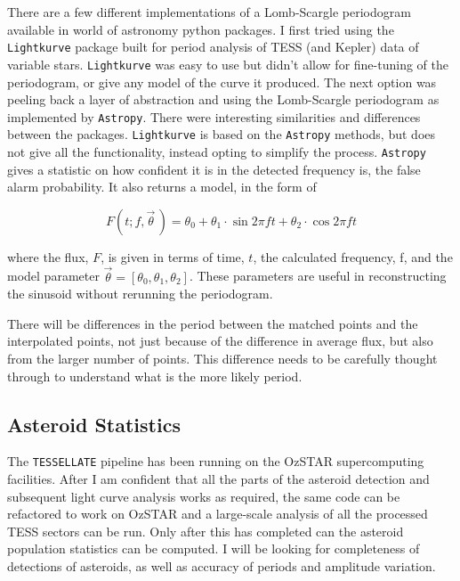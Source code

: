 \documentclass[12pt]{article}
\begin{document}
There are a few different implementations of a Lomb-Scargle periodogram available in world of astronomy python packages.
I first tried using the \texttt{Lightkurve} \citep{Lightkurve2018} package built for period analysis of TESS (and Kepler) data of variable stars.
\texttt{Lightkurve} was easy to use but didn't allow for fine-tuning of the periodogram, or give any model of the curve it produced.
The next option was peeling back a layer of abstraction and using the Lomb-Scargle periodogram as implemented by \texttt{Astropy}\citep[\citet{Astropy2022} but see][for the implementation]{Vanderplas2012,Vanderplas2015}. 
There were interesting similarities and differences between the packages.
\texttt{Lightkurve} is based on the \texttt{Astropy} methods, but does not give all the functionality, instead opting to simplify the process.
\texttt{Astropy} gives a statistic on how confident it is in the detected frequency is, the false alarm probability.
It also returns a model, in the form of

\begin{equation}
  \label{Eq:LCModel}
  F(t;f,\vec{\theta}\,) = \theta_0 + \theta_1\cdot\sin{2\pi ft} +\theta_2\cdot\cos{2\pi ft}
\end{equation}

where the flux, $F$, is given in terms of time, $t$, the calculated frequency, f, and the model parameter $\vec{\theta} = [\theta_0, \theta_1,\theta_2]$.
These parameters are useful in reconstructing the sinusoid without rerunning the periodogram.


There will be differences in the period between the matched points and the interpolated points, not just because of the difference in average flux, but also from the larger number of points. This difference needs to be carefully thought through to understand what is the more likely period.

\subsection{Asteroid Statistics}\label{SubSec:StatMeth}

The \texttt{TESSELLATE} pipeline has been running on the OzSTAR supercomputing facilities.
After I am confident that all the parts of the asteroid detection and subsequent light curve analysis works as required, the same code can be refactored to work on OzSTAR and a large-scale analysis of all the processed TESS sectors can be run.
Only after this has completed can the asteroid population statistics can be computed.
I will be looking for completeness of detections of asteroids, as well as accuracy of periods and amplitude variation.
\end{document}

